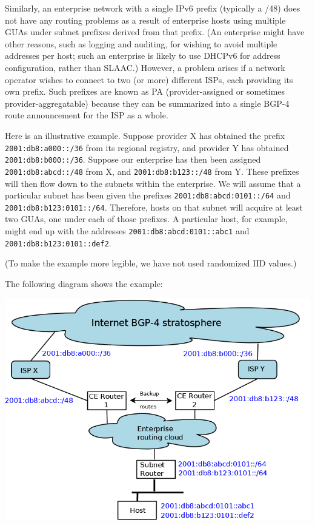 \documentclass[
]{article}
\begin{document}
Similarly, an enterprise network with a single IPv6 prefix (typically a
/48) does not have any routing problems as a result of enterprise hosts
using multiple GUAs under subnet prefixes derived from that prefix. (An
enterprise might have other reasons, such as logging and auditing, for
wishing to avoid multiple addresses per host; such an enterprise is
likely to use DHCPv6 for address configuration, rather than SLAAC.)
However, a problem arises if a network operator wishes to connect to two
(or more) different ISPs, each providing its own prefix. Such prefixes
are known as PA (provider-assigned or sometimes provider-aggregatable)
because they can be summarized into a single BGP-4 route announcement
for the ISP as a whole.

Here is an illustrative example. Suppose provider X has obtained the
prefix \texttt{2001:db8:a000::/36} from its regional registry, and
provider Y has obtained \texttt{2001:db8:b000::/36}. Suppose our
enterprise has then been assigned \texttt{2001:db8:abcd::/48} from X,
and \texttt{2001:db8:b123::/48} from Y. These prefixes will then flow
down to the subnets within the enterprise. We will assume that a
particular subnet has been given the prefixes
\texttt{2001:db8:abcd:0101::/64} and \texttt{2001:db8:b123:0101::/64}.
Therefore, hosts on that subnet will acquire at least two GUAs, one
under each of those prefixes. A particular host, for example, might end
up with the addresses \texttt{2001:db8:abcd:0101::abc1} and
\texttt{2001:db8:b123:0101::def2}.

(To make the example more legible, we have not used randomized IID
values.)

The following diagram shows the example:

\includegraphics{multiPrefix.png}
\end{document}
